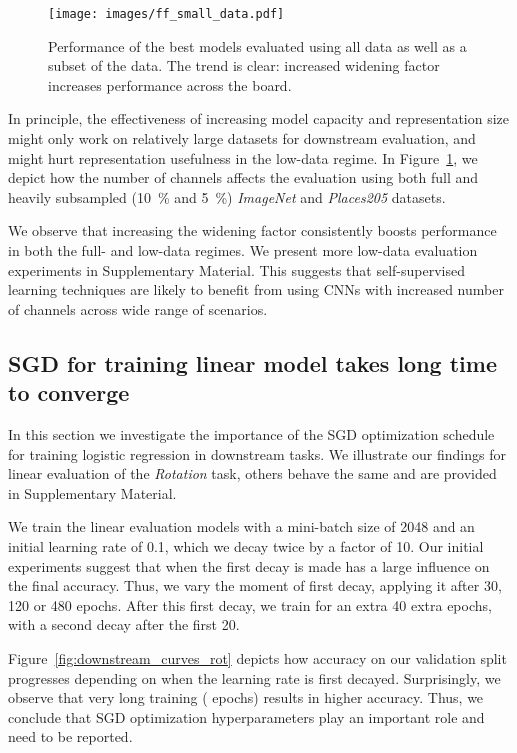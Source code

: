 \documentclass[10pt,twocolumn,letterpaper]{article}
\newcommand{\PAR}[1]{\vskip4pt \noindent {\bf #1~}}
\begin{document}
\begin{figure}[t]
  \begin{center}
    \texttt{[image: images/ff\_small\_data.pdf]}
  \end{center}
  \caption{
     Performance of the best models evaluated using all data as well as a subset of the data.
     The trend is clear: increased widening factor increases performance across the board.
  }\label{fig:ff_small_data}
\end{figure}

\PAR{Low-data regime.}
In principle, the effectiveness of increasing model capacity and representation size might only work on relatively large datasets for downstream evaluation, and might hurt representation usefulness in the low-data regime.
In Figure~\ref{fig:ff_small_data}, we depict how the number of channels affects the evaluation using both full and heavily subsampled (\SI{10}{\percent} and \SI{5}{\percent}) \emph{ImageNet} and \emph{Places205} datasets.


We observe that increasing the widening factor consistently boosts performance in both the full- and low-data regimes.
We present more low-data evaluation experiments in Supplementary Material.
This suggests that self-supervised learning techniques are likely to benefit from using CNNs with increased number of channels across wide range of scenarios.


\subsection{SGD for training linear model takes long time to converge}\label{sec:sgd-long}

In this section we investigate the importance of the SGD optimization schedule for training logistic regression in downstream tasks.
We illustrate our findings for linear evaluation of the \emph{Rotation} task, others behave the same and are provided in Supplementary Material.

We train the linear evaluation models with a mini-batch size of 2048 and an initial learning rate of 0.1, which we decay twice by a factor of 10.
Our initial experiments suggest that when the first decay is made has a large influence on the final accuracy.
Thus, we vary the moment of first decay, applying it after 30, 120 or 480 epochs.
After this first decay, we train for an extra 40 extra epochs, with a second decay after the first 20.

Figure~\ref{fig:downstream_curves_rot} depicts how accuracy on our validation split progresses depending on when the learning rate is first decayed.
Surprisingly, we observe that very long training ( epochs) results in higher accuracy.
Thus, we conclude that SGD optimization hyperparameters play an important role and need to be reported.
\end{document}
